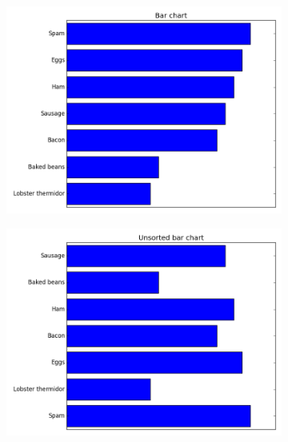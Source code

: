 \begin{figure}[H] %
\centering
\begin{subfigure}{.45\textwidth}
  \centering
  \includegraphics[width=\textwidth]{bar_chart_horizontal_sorted.png}
\end{subfigure}
\begin{subfigure}{.45\textwidth}
  \centering
  \includegraphics[width=\textwidth]{bar_chart_unsorted.png}
\end{subfigure}
\begin{subfigure}{.45\textwidth}
  \centering

\end{subfigure}
\end{figure}
